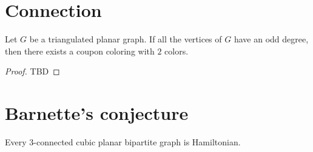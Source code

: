 \section{Connection}

\begin{thm}\label{thm:odd}
  Let $G$ be a triangulated planar graph. If all the vertices of $G$ have an
  odd degree, then there exists a coupon coloring with $2$ colors.
\end{thm}
\begin{proof}
  TBD
\end{proof}

\section{Barnette's conjecture}

\begin{conj}
  Every 3-connected cubic planar bipartite graph is Hamiltonian.
\end{conj}
